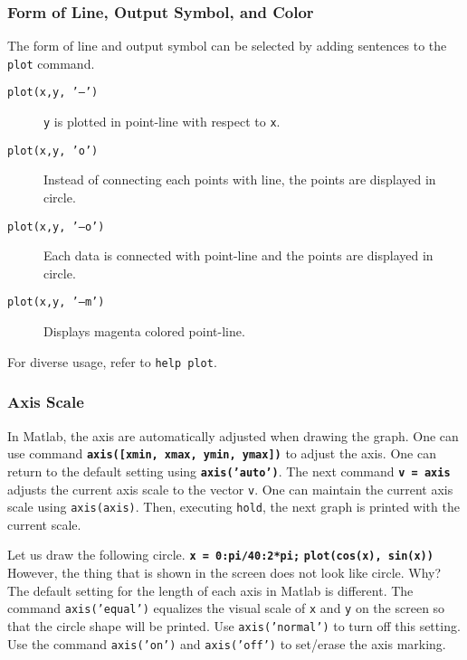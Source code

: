 \subsubsection{Form of Line, Output Symbol, and Color}
The form of line and output symbol can be selected by adding sentences to the {\tt plot} command.

\begin{description}
\item[\tt plot(x,y, '--')] \hfil \par
{\tt y} is plotted in point-line with respect to {\tt x}.
\item[\tt plot(x,y, 'o')] \hfil \par
Instead of connecting each points with line, the points are displayed in circle.
\item[\tt plot(x,y, '--o')] \hfil \par
Each data is connected with point-line and the points are displayed in circle.
\item[\tt plot(x,y, '--m')] \hfil \par
Displays magenta colored point-line. \end{description} \vn For diverse usage, refer to {\tt help plot}.

\subsubsection{Axis Scale}
In Matlab, the axis are automatically adjusted when drawing the graph. One can use command \vv \texttt{\textbf{axis([xmin, xmax, ymin, ymax])}} \vn to adjust the axis. One can return to the default setting using \texttt{\textbf{axis('auto')}}. The next command \vv \texttt{\textbf{v = axis}} \vn adjusts the current axis scale to the vector {\tt v}. One can maintain the current axis scale using {\tt axis(axis)}. Then, executing {\tt hold}, the next graph is printed with the current scale.

\vv Let us draw the following circle. \matlabp\texttt{\textbf{x = 0:pi/40:2*pi;}} \matlabp\texttt{\textbf{plot(cos(x), sin(x))}} \vn However, the thing that is shown in the screen does not look like circle. Why? The default setting for the length of each axis in Matlab is different. The command {\tt axis('equal')} equalizes the visual scale of {\tt x} and {\tt y} on the screen so that the circle shape will be printed. Use {\tt axis('normal')} to turn off this setting. Use the command {\tt axis('on')} and {\tt axis('off')} to set/erase the axis marking.

